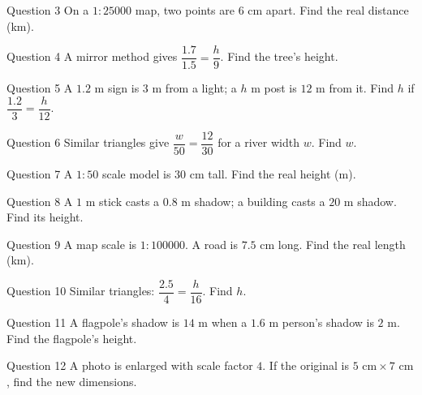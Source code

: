 \documentclass[11pt]{article}
\begin{document}
\begin{qbox}{Question 3}
On a $1:25000$ map, two points are $6$ cm apart. Find the real distance (km).\workspace{2.4cm}
\end{qbox}

\begin{qbox}{Question 4}
A mirror method gives $\dfrac{1.7}{1.5}=\dfrac{h}{9}$. Find the tree's height.\workspace{2.2cm}
\end{qbox}

\begin{qbox}{Question 5}
A $1.2$ m sign is $3$ m from a light; a $h$ m post is $12$ m from it. Find $h$ if $\dfrac{1.2}{3}=\dfrac{h}{12}$.\workspace{2.4cm}
\end{qbox}

\begin{qbox}{Question 6}
Similar triangles give $\dfrac{w}{50}=\dfrac{12}{30}$ for a river width $w$. Find $w$.\workspace{2.2cm}
\end{qbox}

\begin{qbox}{Question 7}
A $1:50$ scale model is $30$ cm tall. Find the real height (m).\workspace{2.2cm}
\end{qbox}

\begin{qbox}{Question 8}
A $1$ m stick casts a $0.8$ m shadow; a building casts a $20$ m shadow. Find its height.\workspace{2.4cm}
\end{qbox}

\begin{qbox}{Question 9}
A map scale is $1:100000$. A road is $7.5$ cm long. Find the real length (km).\workspace{2.2cm}
\end{qbox}

\begin{qbox}{Question 10}
Similar triangles: $\dfrac{2.5}{4}=\dfrac{h}{16}$. Find $h$.\workspace{2.2cm}
\end{qbox}

\begin{qbox}{Question 11}
A flagpole's shadow is $14$ m when a $1.6$ m person's shadow is $2$ m. Find the flagpole's height.\workspace{2.4cm}
\end{qbox}

\begin{qbox}{Question 12}
A photo is enlarged with scale factor $4$. If the original is $5\text{ cm}\times7\text{ cm}$, find the new dimensions.\workspace{2.4cm}
\end{qbox}
\end{document}
